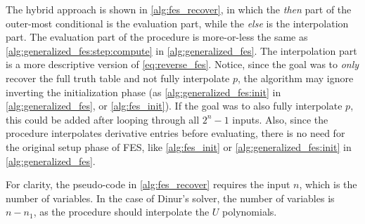 The hybrid approach is shown in \cref{alg:fes_recover}, in which the \textit{then} part of the outer-most conditional is the evaluation part, while the \textit{else} is the interpolation part. The evaluation part of the procedure is more-or-less the same as \cref{alg:generalized_fes:step:compute} in \cref{alg:generalized_fes}. The interpolation part is a more descriptive version of \cref{eq:reverse_fes}. Notice, since the goal was to \textit{only} recover the full truth table and not fully interpolate $p$, the algorithm may ignore inverting the initialization phase (as \cref{alg:generalized_fes:init} in \cref{alg:generalized_fes}, or \cref{alg:fes_init}). If the goal was to also fully interpolate $p$, this could be added after looping through all $2^n - 1$ inputs. Also, since the procedure interpolates derivative entries before evaluating, there is no need for the original setup phase of FES, like \cref{alg:fes_init} or \cref{alg:generalized_fes:init} in \cref{alg:generalized_fes}. 

For clarity, the pseudo-code in \cref{alg:fes_recover} requires the input $n$, which is the number of variables. In the case of Dinur's solver, the number of variables is $n - n_1$, as the procedure should interpolate the $U$ polynomials.
